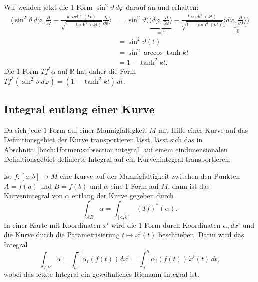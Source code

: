 \begin{beispiel}
Wir wenden jetzt die $1$-Form $\sin^2\vartheta\, d\varphi$ darauf
an und erhalten:
\begin{align*}
\biggl\langle
\sin^2\vartheta\,d\varphi
,
\frac{\partial}{\partial \varphi}
-
\frac{k\operatorname{sech}^2(kt)}{\sqrt{1-\tanh^2(kt)}}
\frac{\partial}{\partial\vartheta}
\biggr\rangle
&=
\sin^2\vartheta
\biggl(
\underbrace{
\biggl\langle
d\varphi,\frac{\partial}{\partial \varphi}
\biggr\rangle
}_{\displaystyle = 1}
-
\frac{k\operatorname{sech}^2(kt)}{\sqrt{1-\tanh^2(kt)}}
\underbrace{
\biggl\langle
d\varphi,\frac{\partial}{\partial\vartheta}
\biggr\rangle
}_{\displaystyle = 0}
\biggr)
\\
&=
\sin^2\vartheta(t)
\\
&=
\sin^2 \arccos \tanh kt
\\
&=
1-\tanh^2 kt.
\end{align*}
Die $1$-Form $Tf^*\alpha$ auf $\mathbb{R}$ hat daher die Form 
$Tf^*(\sin^2\vartheta\,d\varphi)=(1-\tanh^2 kt)\,dt$.
\end{beispiel}


%
%
\subsection{Integral entlang einer Kurve}
Da sich jede $1$-Form auf einer Mannigfaltigkeit $M$ mit Hilfe einer
Kurve auf das Definitionsgebiet der Kurve transportieren lässt, lässt
sich das in Abschnitt~\ref{buch:1formen:subsection:integral} auf einem
eindimensionalen Definitionsgebiet definierte Integral auf ein
Kurvenintegral transportieren.

\begin{definition}
Ist $f\colon [a,b]\to M$ eine Kurve auf der Mannigfaltigkeit zwischen 
den Punkten $A=f(a)$ und $B=f(b)$ und $\alpha$ eine $1$-Form auf $M$,
dann ist das Kurvenintegral von $\alpha$ entlang der Kurve gegeben
durch
\[
\int_{AB} \alpha
=
\int_{[a,b]}
(Tf)^*(\alpha).
\]
In einer Karte mit Koordinaten $x^i$ wird die $1$-Form durch Koordinaten
$\alpha_i\,dx^i$ und die Kurve durch die
Parametrisierung $t\mapsto x^i(t)$ beschrieben.
Darin wird das Integral
\[
\int_{AB} \alpha
=
\int_a^b \alpha_i(f(t)) dx^i
=
\int_a^b \alpha_i(f(t))\,\dot{x}^{i}(t)\,dt,
\]
wobei das letzte Integral ein gewöhnliches Riemann-Integral ist.
\end{definition}

